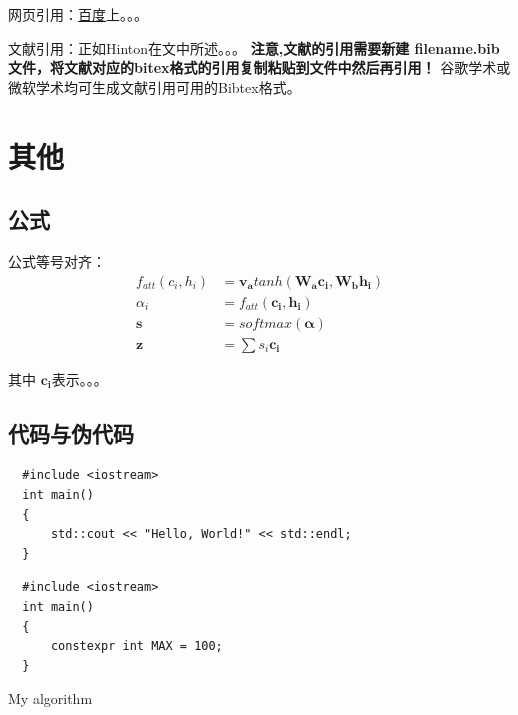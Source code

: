 \documentclass[UTF8,12pt]{article} %
\begin{document}
  网页引用：\href{https:www.baidu.con}{百度}上。。。

  文献引用：正如Hinton在文\cite{lecun2015deep}\cite{xu2015show}中所述。。。
\textbf{注意,文献的引用需要新建 filename.bib 文件，将文献对应的bitex格式的引用复制粘贴到文件中然后再引用！}
谷歌学术或微软学术均可生成文献引用可用的Bibtex格式。

\section{其他}
\subsection{公式}
公式等号对齐：
\begin{align}
  f_{att}(c_i, h_i) &= \boldsymbol{v_a}tanh(\boldsymbol{W_ac_i},\boldsymbol{W_bh_i})\\
  \alpha_i &= f_{att}(\boldsymbol{c_i}, \boldsymbol{h_i})\\
  \boldsymbol{s} &= softmax(\boldsymbol{\alpha})\\
  \boldsymbol{z} &= \sum{s_i\boldsymbol{c_i}}  
\end{align}

  其中 $\boldsymbol{c_i}$表示。。。

\subsection{代码与伪代码}
{\setmainfont{Courier New Bold} %
  \begin{lstlisting}
  #include <iostream>
  int main()
  {
      std::cout << "Hello, World!" << std::endl;
  }  
  \end{lstlisting}
                  
  \begin{lstlisting}
  #include <iostream>
  int main()
  {
      constexpr int MAX = 100;
  }  
  \end{lstlisting}
}

\makeatletter  
\def\BState{\State\hskip-\ALG@thistlm}  
\makeatother  
\begin{algorithm}  
\caption{My algorithm}\label{euclid}  
\end{algorithm}  
\end{document}
